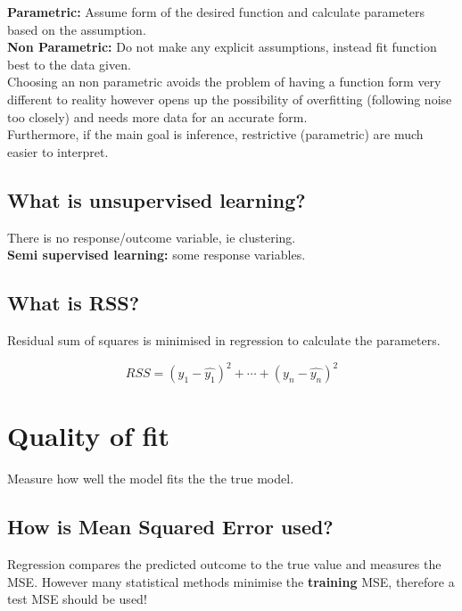 \documentclass[11pt]{scrartcl} %
\begin{document}
\textbf{Parametric:} Assume form of the desired function and calculate parameters based on the assumption.\\

\textbf{Non Parametric:} Do not make any explicit assumptions, instead fit function best to the data given.\\

Choosing an non parametric avoids the problem of having a function form very different to reality however opens up
the possibility of overfitting (following noise too closely) and needs more data for an accurate form.\\

Furthermore, if the main goal is inference, restrictive (parametric) are much easier to interpret.

\subsection{What is unsupervised learning?}

There is no response/outcome variable, ie clustering.\\

\textbf{Semi supervised learning:} some response variables.

\subsection{What is RSS?}

Residual sum of squares is minimised in regression to calculate the parameters.

\begin{equation}
	RSS = (y_1-\hat{y_1})^2 + \cdots +(y_n-\hat{y_n})^2
\end{equation}

\section{Quality of fit}

Measure how well the model fits the the true model.

\subsection{How is Mean Squared Error used?}

Regression compares the predicted outcome to the true value and measures the MSE. However many
statistical methods minimise the \textbf{training} MSE, therefore a test MSE should be used!\\
\end{document}
